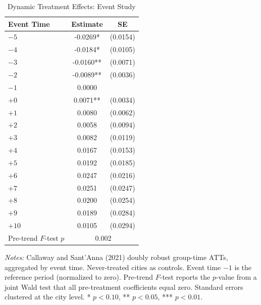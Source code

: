 \begin{table}[t]
\centering
\caption{Dynamic Treatment Effects: Event Study}
\label{tab:eventstudy}
\begin{tabular}{lcc}
\hline\hline
Event Time & Estimate & SE \\
\hline
$-5$ & -0.0269* & (0.0154) \\
$-4$ & -0.0184* & (0.0105) \\
$-3$ & -0.0160** & (0.0071) \\
$-2$ & -0.0089** & (0.0036) \\
$-1$ & 0.0000 &  \\
$+0$ & 0.0071** & (0.0034) \\
$+1$ & 0.0080 & (0.0062) \\
$+2$ & 0.0058 & (0.0094) \\
$+3$ & 0.0082 & (0.0119) \\
$+4$ & 0.0167 & (0.0153) \\
$+5$ & 0.0192 & (0.0185) \\
$+6$ & 0.0247 & (0.0216) \\
$+7$ & 0.0251 & (0.0247) \\
$+8$ & 0.0200 & (0.0254) \\
$+9$ & 0.0189 & (0.0284) \\
$+10$ & 0.0105 & (0.0294) \\
\hline
Pre-trend $F$-test $p$ & \multicolumn{2}{c}{0.002} \\
\hline\hline
\end{tabular}
\par\vspace{0.3em}
{\footnotesize
\textit{Notes:} Callaway and Sant'Anna (2021) doubly robust group-time ATTs, aggregated by event time. Never-treated cities as controls. Event time $-1$ is the reference period (normalized to zero). Pre-trend $F$-test reports the $p$-value from a joint Wald test that all pre-treatment coefficients equal zero. Standard errors clustered at the city level. * $p<0.10$, ** $p<0.05$, *** $p<0.01$.
}
\end{table}

